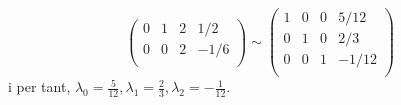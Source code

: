 \documentclass[11pt,a4paper]{article}
\begin{document}
\begin{enumerate}
\begin{enumerate}
\begin{enumerate}
\begin{equation*}
\begin{pmatrix}
                  0 & 1 & 2 & 1/2 \\
                  0 & 0 & 2 & -1/6 \\
               \end{pmatrix}\sim\begin{pmatrix}
                  1 & 0 & 0 & 5/12 \\
                  0 & 1 & 0 & 2/3 \\
                  0 & 0 & 1 & -1/12 \\
               \end{pmatrix}
            \end{equation*}
            i per tant, $\lambda_0=\frac{5}{12},\lambda_1=\frac{2}{3},\lambda_2=-\frac{1}{12}$.
        \end{enumerate}
    \end{enumerate}
\end{enumerate}
\end{document}
